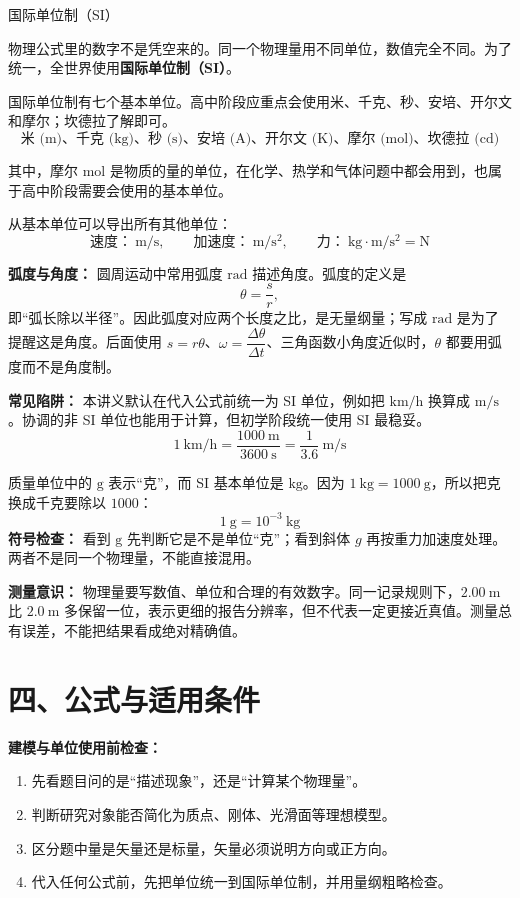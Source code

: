 \begin{conceptbox}{国际单位制（SI）}

物理公式里的数字不是凭空来的。同一个物理量用不同单位，数值完全不同。为了统一，全世界使用\textbf{国际单位制（SI）}。

国际单位制有七个基本单位。高中阶段应重点会使用米、千克、秒、安培、开尔文和摩尔；坎德拉了解即可。
\[
\text{米 (m)、千克 (kg)、秒 (s)、安培 (A)、开尔文 (K)、摩尔 (mol)、坎德拉 (cd)}
\]

其中，摩尔 $\mathrm{mol}$ 是物质的量的单位，在化学、热学和气体问题中都会用到，也属于高中阶段需要会使用的基本单位。

从基本单位可以导出所有其他单位：
\[
\text{速度：}\ \mathrm{m/s},\qquad
\text{加速度：}\ \mathrm{m/s^2},\qquad
\text{力：}\ \mathrm{kg\cdot m/s^2 = N}
\]

\textbf{弧度与角度：} 圆周运动中常用弧度 $\mathrm{rad}$ 描述角度。弧度的定义是
\[
\theta=\frac{s}{r},
\]
即“弧长除以半径”。因此弧度对应两个长度之比，是无量纲量；写成 $\mathrm{rad}$ 是为了提醒这是角度。后面使用 $s=r\theta$、$\omega=\dfrac{\Delta\theta}{\Delta t}$、三角函数小角度近似时，$\theta$ 都要用弧度而不是角度制。

\textbf{常见陷阱：} 本讲义默认在代入公式前统一为 SI 单位，例如把 $\mathrm{km/h}$ 换算成 $\mathrm{m/s}$。协调的非 SI 单位也能用于计算，但初学阶段统一使用 SI 最稳妥。
\[
1\ \mathrm{km/h} = \frac{1000\ \mathrm{m}}{3600\ \mathrm{s}} = \frac{1}{3.6}\ \mathrm{m/s}
\]

质量单位中的 $\mathrm{g}$ 表示“克”，而 SI 基本单位是 $\mathrm{kg}$。因为 $1\ \mathrm{kg}=1000\ \mathrm{g}$，所以把克换成千克要除以 $1000$：
\[
1\ \mathrm{g}=10^{-3}\ \mathrm{kg}
\]
\textbf{符号检查：} 看到 $\mathrm{g}$ 先判断它是不是单位“克”；看到斜体 $g$ 再按重力加速度处理。两者不是同一个物理量，不能直接混用。

\vspace{0.3em}
\textbf{测量意识：} 物理量要写数值、单位和合理的有效数字。同一记录规则下，$2.00\ \mathrm{m}$ 比 $2.0\ \mathrm{m}$ 多保留一位，表示更细的报告分辨率，但不代表一定更接近真值。测量总有误差，不能把结果看成绝对精确值。

\end{conceptbox}

\section*{四、公式与适用条件}

\begin{samepage}
\textbf{建模与单位使用前检查：}
\nopagebreak[4]
\begin{enumerate}
  \item 先看题目问的是“描述现象”，还是“计算某个物理量”。
  \item 判断研究对象能否简化为质点、刚体、光滑面等理想模型。
  \item 区分题中量是矢量还是标量，矢量必须说明方向或正方向。
  \item 代入任何公式前，先把单位统一到国际单位制，并用量纲粗略检查。
\end{enumerate}
\end{samepage}

